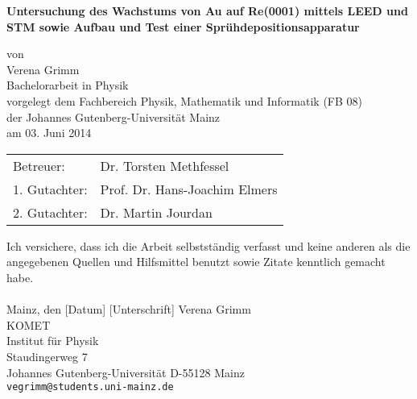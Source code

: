 \documentclass[pdftex,a4paper,german,openbib,final,11pt,twoside,chapterprefix,
headsepline]{scrbook}
\begin{document}

\begin{titlepage}
  \vspace*{6mm}
  \begin{center}
  \linespread{1.0}
     {\sffamily \bfseries \Huge  %
     Untersuchung des Wachstums von Au auf Re(0001) mittels LEED und STM
     sowie Aufbau und Test einer Sprühdepositionsapparatur\par}
     \vspace*{3.5cm}
     {\large von}
     \\[3.5cm]
     \linespread{1}
     {\dfont Verena Grimm}
     \\[2cm]
     {\large Bachelorarbeit in Physik \/\\
        vorgelegt dem Fachbereich Physik, Mathematik und Informatik (FB 08) \/\\
        der Johannes Gutenberg-Universit\"at Mainz \/\\
        am 03. Juni 2014}
   \end{center}
   \newpage
	\null
	\vfill
	\begin{tabular}{ll}
	Betreuer: & Dr. Torsten Methfessel \\
	1. Gutachter: & Prof. Dr. Hans-Joachim Elmers\\
   	2. Gutachter: & Dr. Martin Jourdan
	\end{tabular}
   
\end{titlepage}



\thispagestyle{empty}
Ich versichere, dass ich die Arbeit selbstst\"andig verfasst und keine
anderen als die angegebenen Quellen und Hilfsmittel benutzt sowie
Zitate kenntlich gemacht habe.
\\
\\[3.5cm]
Mainz, den [Datum] [Unterschrift]
\vfill
\noindent
Verena Grimm\\
KOMET\\
Institut f\"ur Physik\\
Staudingerweg 7\\
Johannes Gutenberg-Universit\"at
D-55128 Mainz\\
{\tt vegrimm@students.uni-mainz.de}

\renewcommand\contentsname{Inhaltsverzeichnis}
\renewcommand\figurename{Abbildung}
\renewcommand\tablename{Tabelle}
\tableofcontents
\clearpage 
\end{document}
